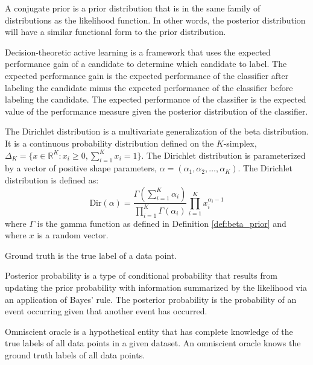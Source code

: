 \begin{defn}
\label{def:conjugate_prior}
A conjugate prior is a prior distribution that is in the same family of distributions as the likelihood function. In other words, the posterior distribution will have a similar functional form to the prior distribution.
\end{defn}

\begin{defn}
\label{def:decision_theoretic}
Decision-theoretic active learning is a framework that uses the expected performance gain of a candidate to determine which candidate to label. The expected performance gain is the expected performance of the classifier after labeling the candidate minus the expected performance of the classifier before labeling the candidate. The expected performance of the classifier is the expected value of the performance measure given the posterior distribution of the classifier.
\end{defn}

\begin{defn}
\label{def:dirichlet_distribution}
The Dirichlet distribution is a multivariate generalization of the beta distribution. It is a continuous probability distribution defined on the \(K\)-simplex, \(\Delta_K = \{x \in \mathbb{R}^K: x_i \geq 0, \sum_{i=1}^K x_i = 1\}\). The Dirichlet distribution is parameterized by a vector of positive shape parameters, \(\alpha = (\alpha_1, \alpha_2, \dots, \alpha_K)\). The Dirichlet distribution is defined as:
\[\text{Dir}(\alpha) = \frac{\Gamma(\sum_{i=1}^K \alpha_i)}{\prod_{i=1}^K \Gamma(\alpha_i)}\prod_{i=1}^K x_i^{\alpha_i - 1}\]
where \(\Gamma\) is the gamma function as defined in Definition \ref{def:beta_prior} and where \(x\) is a random vector.
\end{defn}

\begin{defn}
\label{def:ground_truth}
Ground truth is the true label of a data point.
\end{defn}

\begin{defn}
\label{def:posterior_probabilities}
Posterior probability is a type of conditional probability that results from updating the prior probability with information summarized by the likelihood via an application of Bayes' rule. The posterior probability is the probability of an event occurring given that another event has occurred.
\end{defn}

\begin{defn}
\label{def:omniscient_oracles}
Omniscient oracle is a hypothetical entity that has complete knowledge of the true labels of all data points in a given dataset. An omniscient oracle knows the ground truth labels of all data points.
\end{defn}

